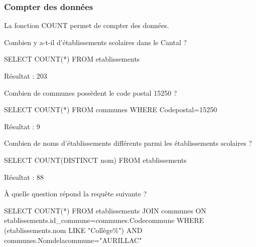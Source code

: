 \documentclass[
  a4paper,
  DIV=11,
  numbers=noendperiod]{scrartcl}
\newenvironment{Shaded}{\begin{snugshade}}{\end{snugshade}}
\newcommand{\DecValTok}[1]{\textcolor[rgb]{0.68,0.00,0.00}{#1}}
\newcommand{\FunctionTok}[1]{\textcolor[rgb]{0.28,0.35,0.67}{#1}}
\newcommand{\KeywordTok}[1]{\textcolor[rgb]{0.00,0.23,0.31}{#1}}
\newcommand{\NormalTok}[1]{\textcolor[rgb]{0.00,0.23,0.31}{#1}}
\newcommand{\OperatorTok}[1]{\textcolor[rgb]{0.37,0.37,0.37}{#1}}
\newcommand{\OtherTok}[1]{\textcolor[rgb]{0.00,0.23,0.31}{#1}}
\begin{document}
\hypertarget{compter-des-donnuxe9es}{%
\subsubsection{Compter des données}\label{compter-des-donnuxe9es}}

La fonction COUNT permet de compter des données.

Combien y a-t-il d'établissements scolaires dans le Cantal ?

\begin{Shaded}
\begin{Highlighting}[]
\KeywordTok{SELECT} \FunctionTok{COUNT}\NormalTok{(}\OperatorTok{*}\NormalTok{)}
\KeywordTok{FROM}\NormalTok{ etablissements}
\end{Highlighting}
\end{Shaded}

Résultat : 203

Combien de communes possèdent le code postal 15250 ?

\begin{Shaded}
\begin{Highlighting}[]
\KeywordTok{SELECT} \FunctionTok{COUNT}\NormalTok{(}\OperatorTok{*}\NormalTok{)}
\KeywordTok{FROM}\NormalTok{ communes}
\KeywordTok{WHERE}\NormalTok{ Codepostal}\OperatorTok{=}\DecValTok{15250}
\end{Highlighting}
\end{Shaded}

Résultat : 9

Combien de noms d'établissements différents parmi les établissements
scolaires ?

\begin{Shaded}
\begin{Highlighting}[]
\KeywordTok{SELECT} \FunctionTok{COUNT}\NormalTok{(}\KeywordTok{DISTINCT}\NormalTok{ nom)}
\KeywordTok{FROM}\NormalTok{ etablissements}
\end{Highlighting}
\end{Shaded}

Résultat : 88

À quelle question répond la requête suivante ?

\begin{Shaded}
\begin{Highlighting}[]
\KeywordTok{SELECT} \FunctionTok{COUNT}\NormalTok{(}\OperatorTok{*}\NormalTok{)}
\KeywordTok{FROM}\NormalTok{ etablissements }\KeywordTok{JOIN}\NormalTok{ communes }
\KeywordTok{ON}\NormalTok{ etablissements.id\_commune}\OperatorTok{=}\NormalTok{communes.Codecommune}
\KeywordTok{WHERE}\NormalTok{ (etablissements.nom }\KeywordTok{LIKE} \OtherTok{"Collège\%"}\NormalTok{) }\KeywordTok{AND}\NormalTok{ communes.Nomdelacommune}\OperatorTok{=}\OtherTok{"AURILLAC"}
\end{Highlighting}
\end{Shaded}
\end{document}

